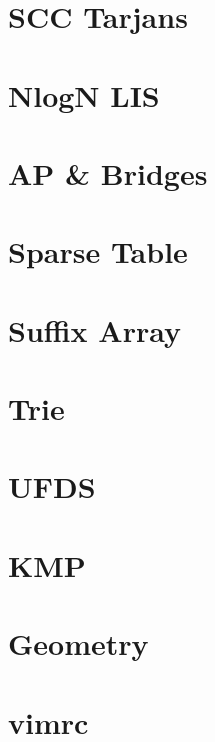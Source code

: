 \documentclass[twocolumn]{article}
\begin{document}
{    \section{SCC Tarjans}
    

    \newpage

    \section{NlogN LIS}
    
    \section{AP \& Bridges}
    
    \section{Sparse Table}
    

    \newpage

    \section{Suffix Array}
    
    \section{Trie}
    
    \section{UFDS}
    

    \newpage

    \section{KMP}
    
    \section{Geometry}
    
    
    \newpage

    \section{vimrc}
    
}
\end{document}
